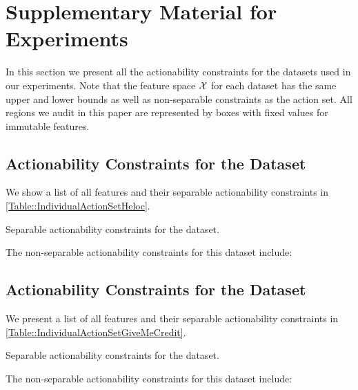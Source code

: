 \section{Supplementary Material for Experiments} \label{app:experiments}

In this section we present all the actionability constraints for the datasets used in our experiments. Note that the feature space ${\cal X}$ for each dataset has the same upper and lower bounds as well as non-separable constraints as the action set. All regions we audit in this paper are represented by boxes with fixed values for immutable features.

\subsection{Actionability Constraints for the  Dataset} 

We show a list of all features and their separable actionability constraints in \cref{Table::IndividualActionSetHeloc}.
\begin{table}[!h]
\centering
\fontsize{9pt}{9pt}\selectfont
\resizebox{0.75\linewidth}{!}{}
\caption{Separable actionability constraints for the  dataset.}
\label{Table::IndividualActionSetHeloc}
\end{table}

The non-separable actionability constraints for this dataset include:

\clearpage
\subsection{Actionability Constraints for the  Dataset} 

We present a list of all features and their separable actionability constraints in \cref{Table::IndividualActionSetGiveMeCredit}.
\begin{table}[!h]
\centering
\fontsize{9pt}{9pt}\selectfont
\resizebox{0.75\linewidth}{!}{}
\caption{Separable actionability constraints for the  dataset.}
\label{Table::IndividualActionSetGiveMeCredit}
\end{table}

The non-separable actionability constraints for this dataset include:



